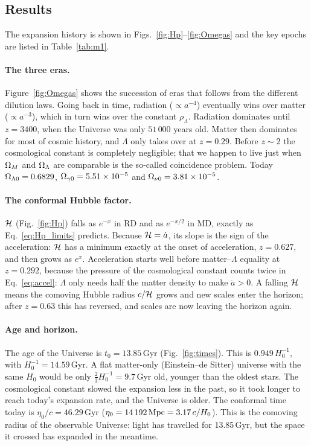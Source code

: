 \subsection{Results}

The expansion history is shown in Figs.~\ref{fig:Hp}--\ref{fig:Omegas} and the key epochs are listed in
Table~\ref{tab:m1}.

\paragraph*{The three eras.} Figure~\ref{fig:Omegas} shows the succession of eras that follows from the different
dilution laws. Going back in time, radiation ($\propto a^{-4}$) eventually wins over matter ($\propto a^{-3}$), which
in turn wins over the constant $\rho_\Lambda$. Radiation dominates until $z=3400$, when the Universe was only
$51\,000$ years old. Matter then dominates for most of cosmic history, and $\Lambda$ only takes over at $z=0.29$. Before
$z\sim2$ the cosmological constant is completely negligible; that we happen to live just when $\Omega_M$ and $\Omega_\Lambda$
are comparable is the so-called coincidence problem. Today $\Omega_{\Lambda0}=0.6829$, $\Omega_{\gamma0}=5.51\times10^{-5}$
and $\Omega_{\nu0}=3.81\times10^{-5}$.

\paragraph*{The conformal Hubble factor.} $\mathcal{H}$ (Fig.~\ref{fig:Hp}) falls as $e^{-x}$ in RD and as $e^{-x/2}$ in MD,
exactly as Eq.~\eqref{eq:Hp_limits} predicts. Because $\mathcal{H}=\dot a$, its slope is the sign of the acceleration: $\mathcal{H}$
has a minimum exactly at the onset of acceleration, $z=0.627$, and then grows as $e^{x}$. Acceleration starts well
before matter--$\Lambda$ equality at $z=0.292$, because the pressure of the cosmological constant counts twice in
Eq.~\eqref{eq:accel}: $\Lambda$ only needs half the matter density to make $\ddot a>0$. A falling $\mathcal{H}$ means the
comoving Hubble radius $c/\mathcal{H}$ grows and new scales enter the horizon; after $z=0.63$ this has reversed, and scales
are now leaving the horizon again.

\paragraph*{Age and horizon.} The age of the Universe is $t_0=13.85$\,Gyr (Fig.~\ref{fig:times}). This is
$0.949\,H_0^{-1}$, with $H_0^{-1}=14.59$\,Gyr. A flat matter-only (Einstein--de Sitter) universe with the same $H_0$
would be only $\tfrac23H_0^{-1}=9.7$\,Gyr old, younger than the oldest stars. The cosmological constant slowed the
expansion less in the past, so it took longer to reach today's expansion rate, and the Universe is older. The
conformal time today is $\eta_0/c=46.29$\,Gyr ($\eta_0=14\,192\,\mathrm{Mpc}=3.17\,c/H_0$). This is the comoving radius of the
observable Universe: light has travelled for 13.85\,Gyr, but the space it crossed has expanded in the meantime.

